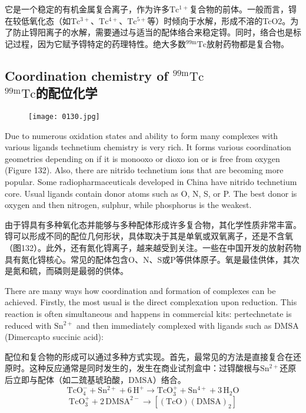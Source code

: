 \documentclass[dvipsnames, svgnames,a4paper,11pt]{article}
\begin{document}
它是一个稳定的有机金属复合离子，作为许多$\mathrm{Tc^{1+}}$复合物的前体。一般而言，锝在较低氧化态（如$\mathrm{Tc^{3+}}$、$\mathrm{Tc^{4+}}$、$\mathrm{Tc^{5+}}$等）时倾向于水解，形成不溶的TcO2。为了防止锝阳离子的水解，需要通过与适当的配体络合来稳定锝。同时，络合也是标记过程，因为它赋予锝特定的药理特性。绝大多数${}^\mathrm{99m}\mathrm{Tc}$放射药物都是复合物。

\subsection{Coordination chemistry of ${}^\mathrm{99m}\mathrm{Tc}$ \\${}^\mathrm{99m}\mathrm{Tc}$的配位化学}

\begin{figure}[h]
	\centering
    \texttt{[image: 0130.jpg]}    
     \label{fig132}
\end{figure}

Due to numerous oxidation states and ability to form many complexes with various
ligands technetium chemistry is very rich. It forms various coordination geometries
depending on if it is monooxo or dioxo ion or is free from oxygen (Figure 132). Also,
there are nitrido technetium ions that are becoming more popular. Some
radiopharmaceuticals developed in China have nitrido technetium core. Usual
ligands contain donor atoms such as O, N, S, or P. The best donor is oxygen and
then nitrogen, sulphur, while phosphorus is the weakest.

由于锝具有多种氧化态并能够与多种配体形成许多复合物，其化学性质非常丰富。锝可以形成不同的配位几何形状，具体取决于其是单氧或双氧离子，还是不含氧（图132）。此外，还有氮化锝离子，越来越受到关注。一些在中国开发的放射药物具有氮化锝核心。常见的配体包含O、N、S或P等供体原子。氧是最佳供体，其次是氮和硫，而磷则是最弱的供体。

There are many ways how coordination and formation of complexes can be achieved.
Firstly, the most usual is the direct complexation upon reduction. This reaction is
often simultaneous and happens in commercial kits: pertechnetate is reduced with
$\mathrm{Sn^{2+}}$ and then immediately complexed with ligands such as DMSA (Dimercapto
succinic acid):

配位和复合物的形成可以通过多种方式实现。首先，最常见的方法是直接复合在还原时。这种反应通常是同时发生的，发生在商业试剂盒中：过锝酸根与$\mathrm{Sn^{2+}}$还原后立即与配体（如二巯基琥珀酸，DMSA）络合。
\[
\mathrm{TcO_4^-} + \mathrm{Sn^{2+}} + 6 \, \mathrm{H^+} \rightarrow \mathrm{TcO_3^+} + \mathrm{Sn^{4+}} + 3 \, \mathrm{H_2O}
\]
\[
\mathrm{TcO_3^+} + 2 \, \mathrm{DMSA^{2-}} \rightarrow [(\mathrm{TcO})(\mathrm{DMSA})_2]
\]
\end{document}
